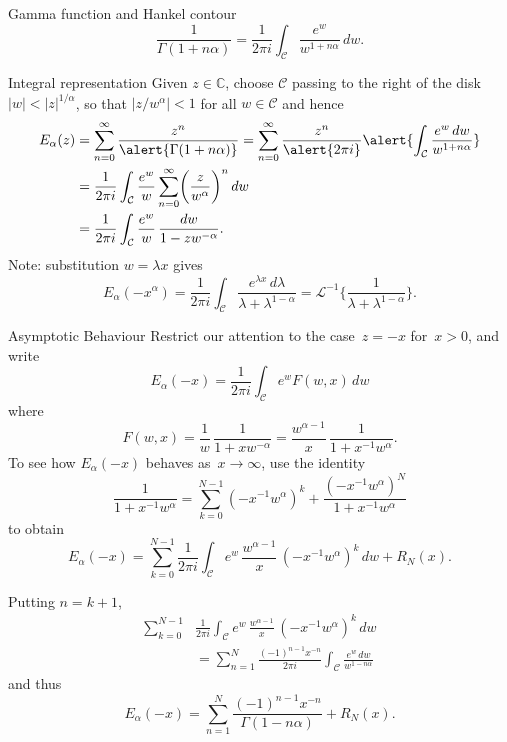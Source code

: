 \documentclass{beamer}
\begin{document}
\begin{frame}{Gamma function and Hankel contour}
\[
\frac{1}{\Gamma(1+n\alpha)}=\frac{1}{2\pi i}\int_{\mathcal{C}}
    \frac{e^w}{w^{1+n\alpha}}\,dw.
\]
\vfill
\begin{center}
\end{center}
\end{frame}
\begin{frame}{Integral representation}
Given $z\in\mathbb{C}$, choose $\mathcal{C}$ passing to the right of the
disk~$|w|<|z|^{1/\alpha}$, so that $|z/w^\alpha|<1$ for all 
$w\in\mathcal{C}$ and hence
\begin{align*}
E_\alpha(z)&=\sum_{n=0}^\infty\frac{z^n}{\alert{\Gamma(1+n\alpha)}}
    =\sum_{n=0}^\infty\frac{z^n}{\alert{2\pi i}}\alert{\int_{\mathcal{C}}
	\frac{e^w\,dw}{w^{1+n\alpha}}}\\
	&=\frac{1}{2\pi i}\int_{\mathcal{C}}\frac{e^w}{w}\sum_{n=0}^\infty
	\biggl(\frac{z}{w^\alpha}\biggr)^n\,dw\\
	&=\frac{1}{2\pi i}\int_{\mathcal{C}}
	\frac{e^w}{w}\,\frac{dw}{1-zw^{-\alpha}}.
\end{align*}
Note: substitution $w=\lambda x$ gives
\[
E_\alpha(-x^\alpha)=\frac{1}{2\pi i}\int_{\mathcal{C}}
    \frac{e^{\lambda x}\,d\lambda}{\lambda+\lambda^{1-\alpha}}
    =\mathcal{L}^{-1}\biggl\{\frac{1}{\lambda+\lambda^{1-\alpha}}\biggr\}.
\]
\end{frame}
\begin{frame}{Asymptotic Behaviour}
Restrict our attention to the case~$z=-x$ for~$x>0$, and write
\[
E_\alpha(-x)=\frac{1}{2\pi i}\int_{\mathcal{C}}e^wF(w,x)\,dw 
\]
where
\[
F(w,x)=\frac{1}{w}\,\frac{1}{1+xw^{-\alpha}}
    =\frac{w^{\alpha-1}}{x}\,\frac{1}{1+x^{-1}w^\alpha}.
\]
To see how $E_\alpha(-x)$ behaves as~$x\to\infty$, use the identity
\[
\frac{1}{1+x^{-1}w^\alpha}=\sum_{k=0}^{N-1}(-x^{-1}w^\alpha)^k
    +\frac{(-x^{-1}w^\alpha)^N}{1+x^{-1}w^\alpha}
\]
to obtain
\[
E_\alpha(-x)=\sum_{k=0}^{N-1}\frac{1}{2\pi i}\int_{\mathcal{C}}
    e^w\,\frac{w^{\alpha-1}}{x}\,(-x^{-1}w^\alpha)^k\,dw+R_N(x).
\]
\end{frame}
\begin{frame}
Putting $n=k+1$,
\begin{align*}
\sum_{k=0}^{N-1}&\frac{1}{2\pi i}\int_{\mathcal{C}}
    e^w\,\frac{w^{\alpha-1}}{x}\,(-x^{-1}w^\alpha)^k\,dw\\
    &=\sum_{n=1}^N\frac{(-1)^{n-1}x^{-n}}{2\pi i}\int_{\mathcal{C}}
    \frac{e^w\,dw}{w^{1-n\alpha}}
\end{align*}    
and thus
\[
E_\alpha(-x)=\sum_{n=1}^N\frac{(-1)^{n-1}x^{-n}}{\Gamma(1-n\alpha)}+R_N(x).
\]
\end{frame}
\end{document}
